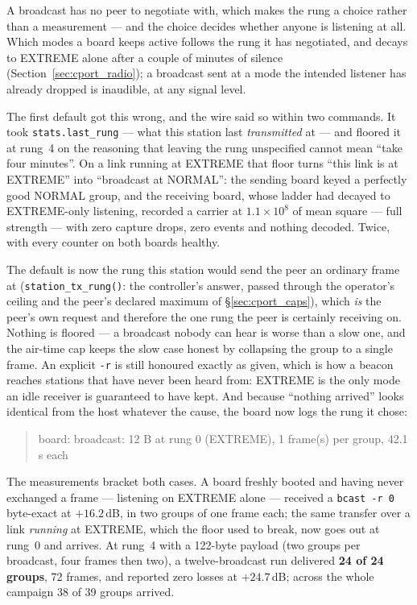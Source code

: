 A broadcast has no peer to negotiate with, which makes the rung a
choice rather than a measurement --- and the choice decides whether
anyone is listening at all. Which modes a board keeps active follows
the rung it has negotiated, and decays to EXTREME alone after a couple
of minutes of silence (Section~\ref{sec:cport_radio}); a broadcast sent
at a mode the intended listener has already dropped is inaudible, at
any signal level.

The first default got this wrong, and the wire said so within two
commands. It took \texttt{stats.last\_rung} --- what this station last
\emph{transmitted} at --- and floored it at rung~4 on the reasoning
that leaving the rung unspecified cannot mean ``take four minutes''.
On a link running at EXTREME that floor turns ``this link is at
EXTREME'' into ``broadcast at NORMAL'': the sending board keyed a
perfectly good NORMAL group, and the receiving board, whose ladder had
decayed to EXTREME-only listening, recorded a carrier at
$1.1\times10^{8}$ of mean square --- full strength --- with zero
capture drops, zero events and nothing decoded. Twice, with every
counter on both boards healthy.

The default is now the rung this station would send the peer an
ordinary frame at (\texttt{station\_tx\_rung()}: the controller's
answer, passed through the operator's ceiling and the peer's declared
maximum of \S\ref{sec:cport_caps}), which \emph{is} the peer's own
request and therefore the one rung the peer is certainly receiving
on. Nothing is floored --- a broadcast nobody can hear is worse than a
slow one, and the air-time cap keeps the slow case honest by collapsing
the group to a single frame. An explicit \texttt{-r} is still honoured
exactly as given, which is how a beacon reaches stations that have
never been heard from: EXTREME is the only mode an idle receiver is
guaranteed to have kept. And because ``nothing arrived'' looks
identical from the host whatever the cause, the board now logs the rung
it chose:

\begin{quote}\ttfamily\small
board: broadcast: 12 B at rung 0 (EXTREME), 1 frame(s) per group,
42.1 s each
\end{quote}

The measurements bracket both cases. A board freshly booted and having
never exchanged a frame --- listening on EXTREME alone --- received a
\texttt{bcast -r 0} byte-exact at $+16.2$\,dB, in two groups of one
frame each; the same transfer over a link \emph{running} at EXTREME,
which the floor used to break, now goes out at rung~0 and arrives. At
rung~4 with a 122-byte payload (two groups per broadcast, four frames
then two), a twelve-broadcast run delivered \textbf{24 of 24 groups},
72 frames, and reported zero losses at $+24.7$\,dB; across the whole
campaign 38 of 39 groups arrived.

